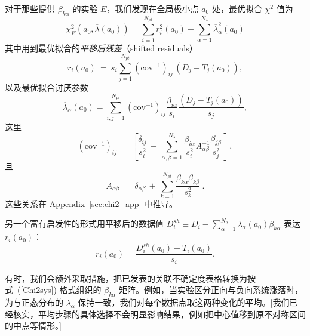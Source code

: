 对于那些提供 $\beta_{k\alpha}$ 的实验 $E$，我们发现在全局极小点 $a_0$ 处，最优拟合 $\chi^2$ 值为
\begin{equation}
\chi^{2}_E (a_{0},\overline \lambda(a_0))=
\sum_{i=1}^{N_{pt}} r_i^2(a_0)
+\sum_{\alpha=1}^{N_\lambda}\overline\lambda^2_\alpha(a_0) \label{Chi2a0l0}
\end{equation}
其中用到最优拟合的{\it 平移后残差}（shifted residuals）
\begin{equation}
  r_{i}(a_0)\  =\ s_{i}\sum_{j=1}^{N_{\mathit{pt}}}(\mathrm{cov}^{-1})_{ij}\,\left(D_{j}-T_{j}(a_0)\right),\label{eq:res-cov}
\end{equation}
以及最优拟合讨厌参数
\begin{equation}
\overline{\lambda}_{\alpha}(a_0) =\sum_{i,j=1}^{N_{\mathit{pt}}}(\mathrm{cov}^{-1})_{ij}\frac{\beta_{i\alpha}}{s_{i}}\frac{\left(D_{j}-T_{j}(a_0)\right)}{s_{j}},
\label{eq:lam-cov}
\end{equation}
这里
\begin{equation}
(\mathrm{cov}^{-1})_{ij}\ =\ \left[\frac{\delta_{ij}}{s_{i}^{2}}\,-\,\sum_{\alpha,\beta=1}^{N_{\lambda}}\frac{\beta_{i\alpha}}{s_{i}^{2}}A_{\alpha\beta}^{-1}\frac{\beta_{j\beta}}{s_{j}^{2}}\right]\ ,\label{eq:covmat}
\end{equation}
且
\begin{equation}
A_{\alpha\beta}\ =\ \delta_{\alpha\beta}\,+\,\sum_{k=1}^{N_{\mathit{pt}}}\frac{\beta_{k\alpha}\beta_{k\beta}}{s_{k}^{2}}\ .
\end{equation}
这些关系在 Appendix~\ref{sec:chi2_app} 中推导。

另一个富有启发性的形式用平移后的数据值 $D_i^{sh}\equiv D_i -
\sum_{\alpha=1}^{N_{\lambda}}\overline \lambda_{\alpha}(a_0) \beta_{k\alpha}$ 表达 $r_i(a_0)$：
\begin{equation}
r_{i}(a_0) = \frac{D_{i}^{sh}(a_0)-T_{i}(a_0)}{s_{i}}. \label{riShifted}
\end{equation}

有时，我们会额外采取措施，把已发表的关联不确定度表格转换为按式~(\ref{Chi2sys}) 格式组织的 $\beta_{k\alpha}$ 矩阵。例如，当实验区分正向与负向系统涨落时，为与正态分布的 $\lambda_{\alpha}$ 保持一致，我们对每个数据点取这两种变化的平均。{[}我们已经核实，平均步骤的具体选择不会明显影响结果，例如把中心值移到原不对称区间的中点等情形。{]}

